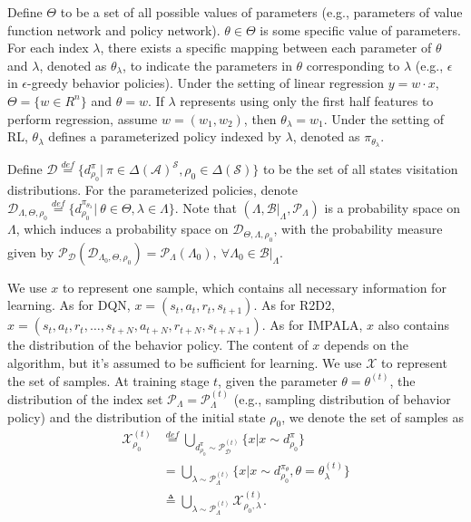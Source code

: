 \documentclass[nohyperref]{article}
\theoremstyle{plain}
\begin{document}
Define $\Theta$ to be a set of all possible values of parameters (e.g., parameters of value function network and policy network).
$\theta \in \Theta$ is some specific value of parameters.
For each index $\lambda$, there exists a specific mapping between each parameter of $\theta$ and $\lambda$, denoted as $\theta_\lambda$, to indicate the parameters in $\theta$ corresponding to $\lambda$ (e.g., $\epsilon$ in $\epsilon$-greedy behavior policies).
Under the setting of linear regression $y = w \cdot x$, $\Theta = \{w \in R^n\}$ and $\theta = w$.
If $\lambda$ represents using only the first half features to perform regression, assume $w = (w_1, w_2)$, then $\theta_\lambda = w_1$.  
Under the setting of RL, $\theta_{\lambda}$ defines a parameterized policy indexed by $\lambda$, denoted as $\pi_{\theta_{\lambda}}$.

Define $\mathcal{D} \overset{def}{=} \{d^\pi_{\rho_{0}} |\ \pi \in {\Delta (\mathcal{A})}^\mathcal{S}, \rho_{0} \in \Delta(\mathcal{S}) \}$ to be the set of all states visitation distributions.
For the parameterized policies, denote 
$\mathcal{D}_{\Lambda, \Theta, \rho_{0}} \overset{def}{=} \{d^{\pi_{\theta_{\lambda}}}_{\rho_{0}} |\ \theta \in \Theta, \lambda \in \Lambda \}$.
Note that $(\Lambda, \mathcal{B}|_{\Lambda}, \mathcal{P}_{\Lambda})$ is a probability space on $\Lambda$, 
which induces a probability space on $\mathcal{D}_{\Theta, \Lambda, \rho_{0}}$,
with the probability measure given by 
$\mathcal{P}_{\mathcal{D}} (\mathcal{D}_{\Lambda_0, \Theta, \rho_{0}}) 
= \mathcal{P}_{\Lambda} (\Lambda_0),\ \forall \Lambda_0 \in \mathcal{B}|_\Lambda$.

We use $x$ to represent one sample, which contains all necessary information for learning. 
As for DQN, $x = (s_t, a_t, r_t, s_{t+1})$.
As for R2D2, $x = (s_t, a_t, r_t, \dots, s_{t+N}, a_{t+N}, r_{t+N}, s_{t+N+1})$.
As for IMPALA, $x$ also contains the distribution of the behavior policy.
The content of $x$ depends on the algorithm, but it's assumed to be sufficient for learning.
We use $\mathcal{X}$ to represent the set of samples.
At training stage $t$, 
given the parameter $\theta = \theta^{(t)}$, 
the distribution of the index set $\mathcal{P}_{\Lambda} = \mathcal{P}^{(t)}_{\Lambda}$ (e.g., sampling distribution of behavior policy)
and the distribution of the initial state $\rho_0$, 
we denote the set of samples as
\begin{equation*}
\begin{aligned}
    \mathcal{X}_{\rho_{0}}^{(t)}
    &\overset{def}{=} \bigcup_{d_{\rho_{0}}^\pi \sim \mathcal{P}_\mathcal{D}^{(t)}} \{ x | x \sim d_{\rho_{0}}^\pi \} \\
    &= \bigcup_{\lambda \sim \mathcal{P}_{\Lambda}^{(t)}} 
    \{ x | x \sim d_{\rho_{0}}^{\pi_\theta}, 
    \theta   = {\theta^{(t)}_{\lambda}} \}
    \\
    &\triangleq \bigcup_{\lambda \sim \mathcal{P}_{\Lambda}^{(t)}} \mathcal{X}^{(t)}_{\rho_{0}, \lambda}.
\end{aligned}
\end{equation*}
\end{document}
